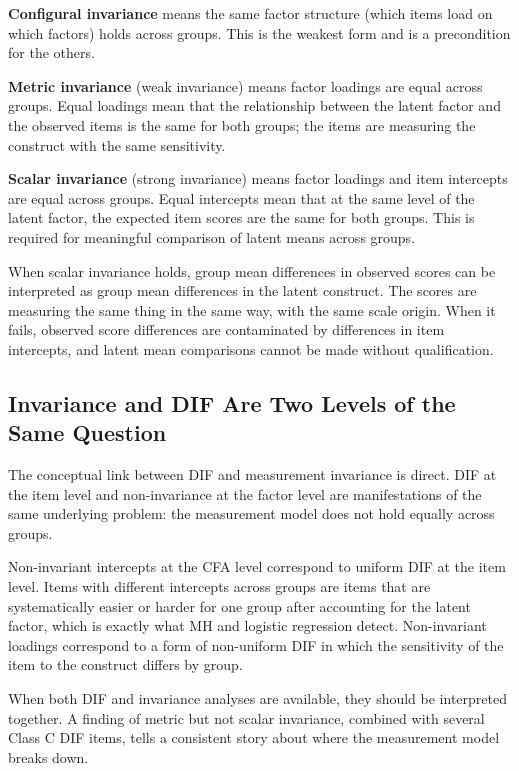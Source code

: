 \documentclass[
  11pt,
  letterpaper,
]{scrbook}
\begin{document}
\textbf{Configural invariance} means the same factor structure (which
items load on which factors) holds across groups. This is the weakest
form and is a precondition for the others.

\textbf{Metric invariance} (weak invariance) means factor loadings are
equal across groups. Equal loadings mean that the relationship between
the latent factor and the observed items is the same for both groups;
the items are measuring the construct with the same sensitivity.

\textbf{Scalar invariance} (strong invariance) means factor loadings and
item intercepts are equal across groups. Equal intercepts mean that at
the same level of the latent factor, the expected item scores are the
same for both groups. This is required for meaningful comparison of
latent means across groups.

When scalar invariance holds, group mean differences in observed scores
can be interpreted as group mean differences in the latent construct.
The scores are measuring the same thing in the same way, with the same
scale origin. When it fails, observed score differences are contaminated
by differences in item intercepts, and latent mean comparisons cannot be
made without qualification.

\subsection{Invariance and DIF Are Two Levels of the Same
Question}\label{invariance-and-dif-are-two-levels-of-the-same-question}

The conceptual link between DIF and measurement invariance is direct.
DIF at the item level and non-invariance at the factor level are
manifestations of the same underlying problem: the measurement model
does not hold equally across groups.

Non-invariant intercepts at the CFA level correspond to uniform DIF at
the item level. Items with different intercepts across groups are items
that are systematically easier or harder for one group after accounting
for the latent factor, which is exactly what MH and logistic regression
detect. Non-invariant loadings correspond to a form of non-uniform DIF
in which the sensitivity of the item to the construct differs by group.

When both DIF and invariance analyses are available, they should be
interpreted together. A finding of metric but not scalar invariance,
combined with several Class C DIF items, tells a consistent story about
where the measurement model breaks down.
\end{document}
